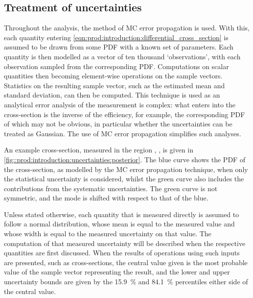 \begin{table}
  \caption[Charm hadron fragmentation fractions]{%
    Charm hadron fragmentation fractions~\cite{PDG2008}.
  }
  \label{tab:prod:introduction:fragmentation_fractions}
  \centering
  
\end{table}

\subsection{Treatment of uncertainties}
\label{chap:prod:introduction:uncertainties}

Throughout the analysis, the method of \acl{MC} error propagation is used.
With this, each quantity entering 
\cref{eqn:prod:introduction:differential_cross_section} is assumed to be drawn 
from some \acf{PDF} with a known set of parameters.
Each quantity is then modelled as a vector of ten thousand `observations', with 
each observation sampled from the corresponding \ac{PDF}.
Computations on scalar quantities then becoming element-wise operations on the 
sample vectors.
Statistics on the resulting sample vector, such as the estimated mean and 
standard deviation, can then be computed.
This technique is used as an analytical error analysis of the measurement is 
complex: what enters into the cross-section is the inverse of the efficiency, 
for example, the corresponding \acl{PDF} of which may not be obvious, in 
particular whether the uncertainties can be treated as Gaussian.
The use of \acl{MC} error propagation simplifies such analyses.

An example cross-section, measured in the region , 
, is given in 
\cref{fig::prod:introduction:uncertainties:posterior}.
The blue curve shows the \ac{PDF} of the cross-section, as modelled by the 
\ac{MC} error propagation technique, when only the statistical uncertainty is 
considered, whilst the green curve also includes the contributions from the 
systematic uncertainties.
The green curve is not symmetric, and the mode is shifted with respect to that 
of the blue.

Unless stated otherwise, each quantity that is measured directly is assumed to 
follow a normal distribution, whose mean is equal to the measured value and 
whose width is equal to the measured uncertainty on that value.
The computation of that measured uncertainty will be described when the 
respective quantities are first discussed.
When the results of operations using such inputs are presented, such as 
cross-sections, the central value given is the most probable value of the 
sample vector representing the result, and the lower and upper uncertainty 
bounds are given by the \SI{15.9}{\percent} and \SI{84.1}{\percent} percentiles 
either side of the central value.

